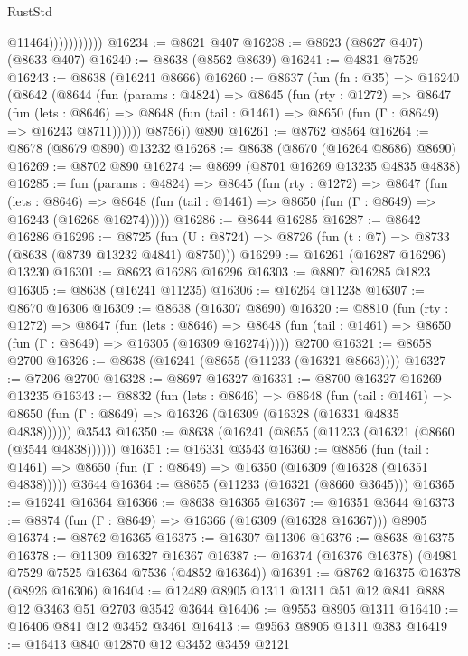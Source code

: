 \begin{lexlean}{RustStd}
\begin{coremodule}
                          @11464)))))))))))
@16234 := @8621 @407
@16238 := @8623 (@8627 @407) (@8633 @407)
@16240 := @8638 (@8562 @8639)
@16241 := @4831 @7529
@16243 := @8638 (@16241 @8666)
@16260 := @8637
    (fun (fn : @35) =>
    @16240
      (@8642
        (@8644
          (fun (params : @4824) =>
          @8645
            (fun (rty : @1272) =>
            @8647
              (fun (lets : @8646) =>
              @8648 (fun (tail : @1461) => @8650 (fun (Γ : @8649) => @16243 @8711))))))
        @8756))
    @890
@16261 := @8762 @8564
@16264 := @8678 (@8679 @890) @13232
@16268 := @8638 (@8670 (@16264 @8686) @8690)
@16269 := @8702 @890
@16274 := @8699 (@8701 @16269 @13235 @4835 @4838)
@16285 := fun (params : @4824) =>
  @8645
    (fun (rty : @1272) =>
    @8647
      (fun (lets : @8646) =>
      @8648 (fun (tail : @1461) => @8650 (fun (Γ : @8649) => @16243 (@16268 @16274)))))
@16286 := @8644 @16285
@16287 := @8642 @16286
@16296 := @8725
    (fun (U : @8724) => @8726 (fun (t : @7) => @8733 (@8638 (@8739 @13232 @4841) @8750)))
@16299 := @16261 (@16287 @16296) @13230
@16301 := @8623 @16286 @16296
@16303 := @8807 @16285 @1823
@16305 := @8638 (@16241 @11235)
@16306 := @16264 @11238
@16307 := @8670 @16306
@16309 := @8638 (@16307 @8690)
@16320 := @8810
    (fun (rty : @1272) =>
    @8647
      (fun (lets : @8646) =>
      @8648 (fun (tail : @1461) => @8650 (fun (Γ : @8649) => @16305 (@16309 @16274)))))
    @2700
@16321 := @8658 @2700
@16326 := @8638 (@16241 (@8655 (@11233 (@16321 @8663))))
@16327 := @7206 @2700
@16328 := @8697 @16327
@16331 := @8700 @16327 @16269 @13235
@16343 := @8832
    (fun (lets : @8646) =>
    @8648
      (fun (tail : @1461) =>
      @8650 (fun (Γ : @8649) => @16326 (@16309 (@16328 (@16331 @4835 @4838))))))
    @3543
@16350 := @8638 (@16241 (@8655 (@11233 (@16321 (@8660 (@3544 @4838))))))
@16351 := @16331 @3543
@16360 := @8856
    (fun (tail : @1461) => @8650 (fun (Γ : @8649) => @16350 (@16309 (@16328 (@16351 @4838)))))
    @3644
@16364 := @8655 (@11233 (@16321 (@8660 @3645)))
@16365 := @16241 @16364
@16366 := @8638 @16365
@16367 := @16351 @3644
@16373 := @8874 (fun (Γ : @8649) => @16366 (@16309 (@16328 @16367))) @8905
@16374 := @8762 @16365
@16375 := @16307 @11306
@16376 := @8638 @16375
@16378 := @11309 @16327 @16367
@16387 := @16374 (@16376 @16378) (@4981 @7529 @7525 @16364 @7536 (@4852 @16364))
@16391 := @8762 @16375 @16378 (@8926 @16306)
@16404 := @12489 @8905 @1311 @1311 @51 @12 @841 @888 @12 @3463 @51 @2703 @3542 @3644
@16406 := @9553 @8905 @1311
@16410 := @16406 @841 @12 @3452 @3461
@16413 := @9563 @8905 @1311 @383
@16419 := @16413 @840 @12870 @12 @3452 @3459 @2121

\end{coremodule}
\end{lexlean}
